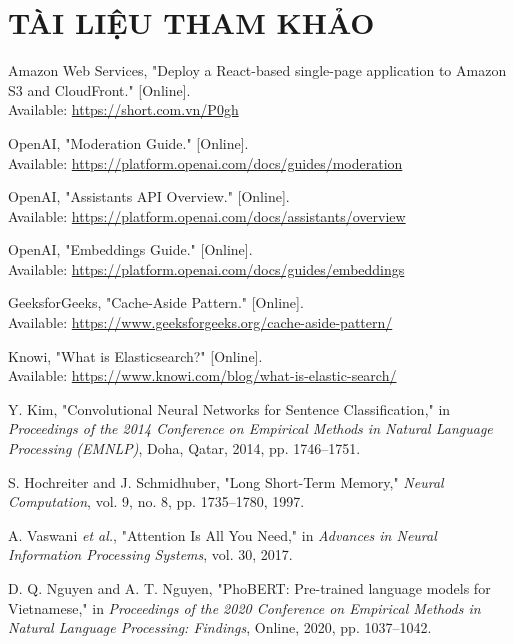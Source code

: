 \clearpage
\section{TÀI LIỆU THAM KHẢO}
\begin{thebibliography}{00}

Amazon Web Services, "Deploy a React-based single-page application to Amazon S3 and CloudFront." [Online].\\
Available: \url{https://short.com.vn/P0gh}

OpenAI, "Moderation Guide." [Online].\\
Available: \url{https://platform.openai.com/docs/guides/moderation}

OpenAI, "Assistants API Overview." [Online].\\
Available: \url{https://platform.openai.com/docs/assistants/overview}

OpenAI, "Embeddings Guide." [Online].\\
Available: \url{https://platform.openai.com/docs/guides/embeddings}

GeeksforGeeks, "Cache-Aside Pattern." [Online].\\
Available: \url{https://www.geeksforgeeks.org/cache-aside-pattern/}

Knowi, "What is Elasticsearch?" [Online].\\
Available: \url{https://www.knowi.com/blog/what-is-elastic-search/}

Y. Kim, "Convolutional Neural Networks for Sentence Classification," in \textit{Proceedings of the 2014 Conference on Empirical Methods in Natural Language Processing (EMNLP)}, Doha, Qatar, 2014, pp. 1746--1751.

S. Hochreiter and J. Schmidhuber, "Long Short-Term Memory," \textit{Neural Computation}, vol. 9, no. 8, pp. 1735--1780, 1997.

A. Vaswani \textit{et al.}, "Attention Is All You Need," in \textit{Advances in Neural Information Processing Systems}, vol. 30, 2017.

D. Q. Nguyen and A. T. Nguyen, "PhoBERT: Pre-trained language models for Vietnamese," in \textit{Proceedings of the 2020 Conference on Empirical Methods in Natural Language Processing: Findings}, Online, 2020, pp. 1037--1042.

\end{thebibliography}
